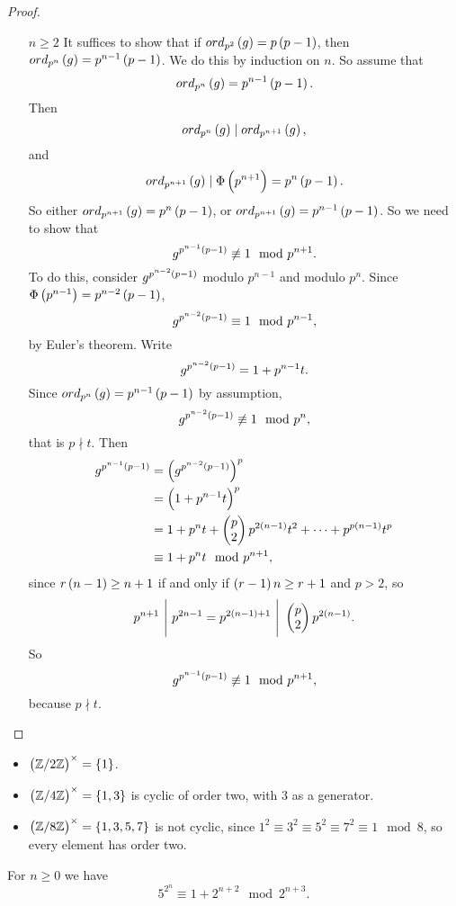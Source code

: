 \begin{proof}
\begin{itemize}[leftmargin=0.5in]
\item[$ n \ge 2 $] It suffices to show that if $ ord_{p^2}\br{g} = p\br{p - 1} $, then $ ord_{p^n}\br{g} = p^{n - 1}\br{p - 1} $. We do this by induction on $ n $. So assume that
$$ ord_{p^n}\br{g} = p^{n - 1}\br{p - 1}. $$
Then
$$ ord_{p^n}\br{g} \mid ord_{p^{n + 1}}\br{g}, $$
and
$$ ord_{p^{n + 1}}\br{g} \mid \Phi\br{p^{n + 1}} = p^n\br{p - 1}. $$
So either $ ord_{p^{n + 1}}\br{g} = p^n\br{p - 1} $, or $ ord_{p^{n + 1}}\br{g} = p^{n - 1}\br{p - 1} $. So we need to show that
$$ g^{p^{n - 1}\br{p - 1}} \not\equiv 1 \mod p^{n + 1}. $$
To do this, consider $ g^{p^{n - 2}\br{p - 1}} $ modulo $ p^{n - 1} $ and modulo $ p^n $. Since $ \Phi\br{p^{n - 1}} = p^{n - 2}\br{p - 1} $,
$$ g^{p^{n - 2}\br{p - 1}} \equiv 1 \mod p^{n - 1}, $$
by Euler's theorem. Write
$$ g^{p^{n - 2}\br{p - 1}} = 1 + p^{n - 1}t. $$
Since $ ord_{p^n}\br{g} = p^{n - 1}\br{p - 1} $ by assumption,
$$ g^{p^{n - 2}\br{p - 1}} \not\equiv 1 \mod p^n, $$
that is $ p \nmid t $. Then
\begin{align*}
g^{p^{n - 1}\br{p - 1}}
& = \br{g^{p^{n - 2}\br{p - 1}}}^p \\
& = \br{1 + p^{n - 1}t}^p \\
& = 1 + p^nt + \twobyone{p}{2}p^{2\br{n - 1}}t^2 + \dots + p^{p\br{n - 1}}t^p \\
& \equiv 1 + p^nt \mod p^{n + 1},
\end{align*}
since $ r\br{n - 1} \ge n + 1 $ if and only if $ \br{r - 1}n \ge r + 1 $ and $ p > 2 $, so
$$ p^{n + 1} \ \Bigg| \ p^{2n - 1} = p^{2\br{n - 1} + 1} \ \Bigg| \ \twobyone{p}{2}p^{2\br{n - 1}}. $$
So
$$ g^{p^{n - 1}\br{p - 1}} \not\equiv 1 \mod p^{n + 1}, $$
because $ p \nmid t $.
\end{itemize}
\end{proof}

\begin{example*}
\hfill
\begin{itemize}
\item $ \unit{2} = \cbr{1} $.
\item $ \unit{4} = \cbr{1, 3} $ is cyclic of order two, with $ 3 $ as a generator.
\item $ \unit{8} = \cbr{1, 3, 5, 7} $ is not cyclic, since $ 1^2 \equiv 3^2 \equiv 5^2 \equiv 7^2 \equiv 1 \mod 8 $, so every element has order two.
\end{itemize}
\end{example*}

\pagebreak

\begin{lemma}
\label{lem:27}
For $ n \ge 0 $ we have
$$ 5^{2^n} \equiv 1 + 2^{n + 2} \mod 2^{n + 3}. $$
\end{lemma}

